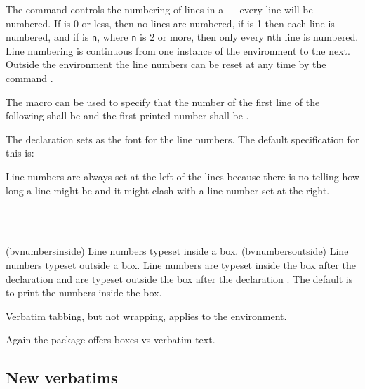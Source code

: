 {{{{The command \cmd{\linenumberfrequency} controls the 
numbering of lines in
a  --- every  line will be numbered. 
If  is 0 or less, 
then no lines are numbered, if  is 1 then each line is numbered,
and if  is \texttt{n}, where \texttt{n} is 2 or more, then 
only every \texttt{n}th line is numbered. Line numbering is continuous 
from one instance
of the  environment to the next. Outside the environment
the line numbers can be reset at any time by the 
command \cmd{\resetbvlinenumber}.

The \cmd{\setbvlinenums} macro can be
used to specify that the number of the first line of the following 
shall be  and the first printed number shall be .

The \cmd{\linenumberfont} declaration sets
 as the font for the 
line numbers. The default specification for this is:
\begin{lcode}
\linenumberfont{\footnotesize\rmfamily}
\end{lcode}
Line numbers are always set at the left of 
the lines because there
is no telling how long a line might be and it might clash with a line number
set at the right.
\begin{syntax}
\cmd{\bvnumbersinside} \\
\cmd{\bvnumbersoutside} \\
\end{syntax}
\glossary(bvnumbersinside)%
  {}%
  {Line numbers typeset inside a  box.}
\glossary(bvnumbersoutside)%
  {}%
  {Line numbers typeset outside a  box.}
Line numbers are typeset inside the box after the declaration 
\cmd{\bvnumberinside} and are typeset outside the box after the
declaration \cmd{\bvnumbersoutside}. The default is to print
the numbers inside the box.

    Verbatim tabbing, but not wrapping, applies to the 
environment.

\begin{recommended}
  Again the  package offers boxes vs verbatim text.
\end{recommended}


\subsection{New verbatims}

}}}}
